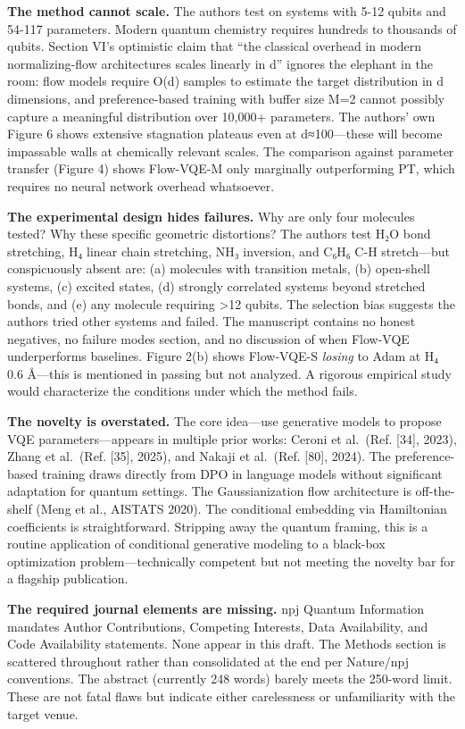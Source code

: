 \documentclass[10pt,letterpaper]{article}
\begin{document}
\textbf{The method cannot scale.} The authors test on systems with 5-12 qubits and 54-117 parameters. Modern quantum chemistry requires hundreds to thousands of qubits. Section VI's optimistic claim that ``the classical overhead in modern normalizing-flow architectures scales linearly in d'' ignores the elephant in the room: flow models require O(d) samples to estimate the target distribution in d dimensions, and preference-based training with buffer size M=2 cannot possibly capture a meaningful distribution over 10,000+ parameters. The authors' own Figure 6 shows extensive stagnation plateaus even at d≈100---these will become impassable walls at chemically relevant scales. The comparison against parameter transfer (Figure 4) shows Flow-VQE-M only marginally outperforming PT, which requires no neural network overhead whatsoever.

\textbf{The experimental design hides failures.} Why are only four molecules tested? Why these specific geometric distortions? The authors test H₂O bond stretching, H₄ linear chain stretching, NH₃ inversion, and C₆H₆ C-H stretch---but conspicuously absent are: (a) molecules with transition metals, (b) open-shell systems, (c) excited states, (d) strongly correlated systems beyond stretched bonds, and (e) any molecule requiring \textgreater12 qubits. The selection bias suggests the authors tried other systems and failed. The manuscript contains no honest negatives, no failure modes section, and no discussion of when Flow-VQE underperforms baselines. Figure 2(b) shows Flow-VQE-S \emph{losing} to Adam at H₄ 0.6 Å---this is mentioned in passing but not analyzed. A rigorous empirical study would characterize the conditions under which the method fails.

\textbf{The novelty is overstated.} The core idea---use generative models to propose VQE parameters---appears in multiple prior works: Ceroni et al.~(Ref. {[}34{]}, 2023), Zhang et al.~(Ref. {[}35{]}, 2025), and Nakaji et al.~(Ref. {[}80{]}, 2024). The preference-based training draws directly from DPO in language models without significant adaptation for quantum settings. The Gaussianization flow architecture is off-the-shelf (Meng et al., AISTATS 2020). The conditional embedding via Hamiltonian coefficients is straightforward. Stripping away the quantum framing, this is a routine application of conditional generative modeling to a black-box optimization problem---technically competent but not meeting the novelty bar for a flagship publication.

\textbf{The required journal elements are missing.} npj Quantum Information mandates Author Contributions, Competing Interests, Data Availability, and Code Availability statements. None appear in this draft. The Methods section is scattered throughout rather than consolidated at the end per Nature/npj conventions. The abstract (currently 248 words) barely meets the 250-word limit. These are not fatal flaws but indicate either carelessness or unfamiliarity with the target venue.
\end{document}
